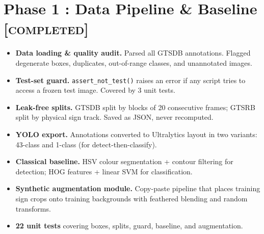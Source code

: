 \documentclass[12pt,a4paper]{article}
\begin{document}
\section*{Phase 1 : Data Pipeline \& Baseline {\normalsize\color{medgray}\textsc{[completed]}}}

\begin{phasebox}[title={What We Built}]
\begin{itemize}[leftmargin=1.2em, itemsep=3pt]
  \item \textbf{Data loading \& quality audit.} Parsed all GTSDB annotations. Flagged degenerate boxes, duplicates, out-of-range classes, and unannotated images.
  \item \textbf{Test-set guard.} \texttt{assert\_not\_test()} raises an error if any script tries to access a frozen test image. Covered by 3 unit tests.
  \item \textbf{Leak-free splits.} GTSDB split by blocks of 20 consecutive frames; GTSRB split by physical sign track. Saved as JSON, never recomputed.
  \item \textbf{YOLO export.} Annotations converted to Ultralytics layout in two variants: 43-class and 1-class (for detect-then-classify).
  \item \textbf{Classical baseline.} HSV colour segmentation + contour filtering for detection; HOG features + linear SVM for classification.
  \item \textbf{Synthetic augmentation module.} Copy-paste pipeline that places training sign crops onto training backgrounds with feathered blending and random transforms.
  \item \textbf{22 unit tests} covering boxes, splits, guard, baseline, and augmentation.
\end{itemize}
\end{phasebox}

\vspace{4pt}
\end{document}
